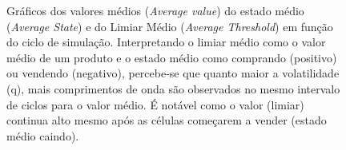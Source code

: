 \documentclass[
	12pt,				%
	openright,			%
	twoside,			%
	a4paper,			%
	english,			%
	french,				%
	spanish,			%
	brazil				%
	]{abntex2}
\begin{document}
\begin{figure}
  \centering

  
  \caption{Gráficos dos valores médios (\textit{Average value}) do estado médio (\textit{Average State}) e do Limiar Médio (\textit{Average Threshold}) em função do ciclo de simulação. Interpretando o limiar médio como o valor médio de um produto e o estado médio como comprando (positivo) ou vendendo (negativo), percebe-se que quanto maior a volatilidade (q), mais comprimentos de onda são observados no mesmo intervalo de ciclos para o valor médio. É notável como o valor (limiar) continua alto mesmo após as células começarem a vender (estado médio caindo).}
  \label{fig:volatilidadeMoore}
\end{figure}
\end{document}
